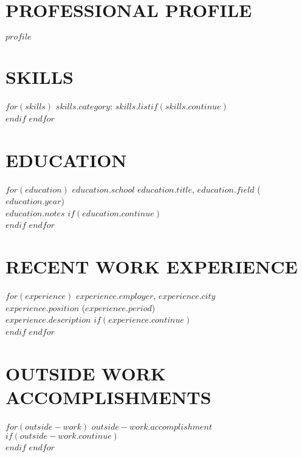\documentclass[a4paper, line, 11pt]{res} %
\begin{document}
 
 
\address{$if(contact.address)$$contact.address$\\$endif$$if(contact.telephone)$Tel: $contact.telephone$$endif$}        
\address{$if(contact.email)$E-mail: $contact.email$$endif$$if(contact.url)$\\ URL: $contact.url$$endif$$if(contact.extra)$$contact.extra$$endif$}
  
                        
\begin{resume}                         
 
\section{PROFESSIONAL PROFILE}  
  $profile$ 

\section{SKILLS}  

$for(skills)$
    \textbf{$skills.category$}: $skills.list$$if(skills.continue)$\\$endif$
$endfor$

\section{EDUCATION} 

$for(education)$
    \uppercase{$education.school$} \emph{$education.title$}, $education.field$ ($education.year$)\\ $education.notes$ $if(education.continue)$\\$endif$
$endfor$

  

\section{RECENT WORK EXPERIENCE}
$for(experience)$
    \textbf{\uppercase{$experience.employer$}}, $experience.city$ \\ \emph{$experience.position$} ($experience.period$)\\ $experience.description$ $if(experience.continue)$\\$endif$
$endfor$


\section{OUTSIDE WORK ACCOMPLISHMENTS}  


$for(outside-work)$
    $outside-work.accomplishment$$if(outside-work.continue)$\\$endif$
$endfor$

\end{resume}
\end{document}
